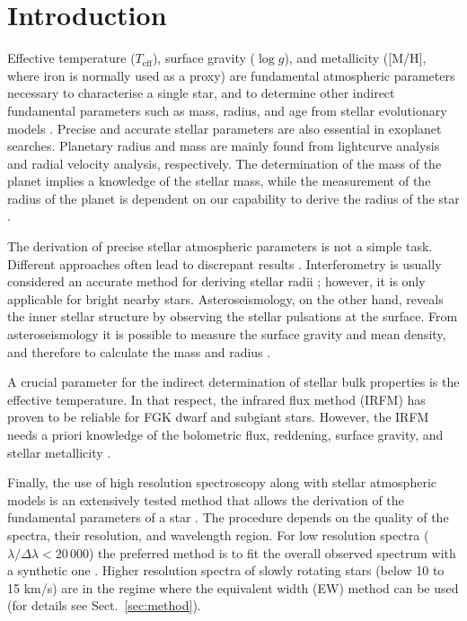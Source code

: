 \documentclass{aa}
\begin{document}
\maketitle



\section{Introduction}
\label{sec:introduction}

Effective temperature ($T_\mathrm{eff}$), surface gravity ($\log g$),
and metallicity ([M/H], where iron is normally used as a proxy)
are fundamental atmospheric parameters necessary to characterise a single
star, and to determine other indirect fundamental parameters
such as mass, radius, and age from stellar evolutionary models
\citep[see e.g.][]{Girardi2000,Dotter2008,Baraffe2015}.
Precise and accurate stellar parameters are also essential in
exoplanet searches. Planetary radius and mass are mainly found from
lightcurve analysis and radial velocity analysis, respectively. The
determination of the mass of the planet implies a knowledge of the
stellar mass, while the measurement of the radius of the planet
is dependent on our capability to derive the radius of the star
\citep[see e.g.][]{Torres2008,Ammler2009,Torres2012}.

The derivation of precise stellar atmospheric parameters is not a simple
task. Different approaches often lead to discrepant results \citep[see
e.g.][]{Santos13}. Interferometry is usually considered  an accurate
method for deriving stellar radii \citep[e.g.][]{Boyajian2012}; however,
it is only applicable for bright nearby stars. Asteroseismology, on the
other hand, reveals the inner stellar structure by observing the stellar
pulsations at the surface. From asteroseismology it is possible to
measure the surface gravity and mean density, and therefore to calculate
the mass and radius \citep[e.g.][]{Kjeldsen1995}.

A crucial parameter for the indirect determination of stellar bulk
properties is the effective temperature. In that respect, the infrared
flux method (IRFM) has proven to be reliable for FGK dwarf and
subgiant stars. However, the IRFM needs a priori knowledge of the
bolometric flux, reddening, surface gravity, and stellar metallicity
\citep{Blackwell1977,Ramirez2005b,Casagrande2010}.

Finally, the use of high resolution spectroscopy along with stellar
atmospheric models is an extensively tested method that allows
the derivation of the fundamental parameters of a star \citep[see
e.g.][]{Santos13,Valenti2005}. The procedure depends on the quality
of the spectra, their resolution, and wavelength region. For low
resolution spectra ($\lambda/\Delta\lambda < 20\,000$) the
preferred method is to fit the overall observed spectrum with a synthetic one
\citep[see e.g.][]{Recio2006}. Higher resolution spectra of
slowly rotating stars (below 10 to 15 \si{km/s})  are in the regime
where the equivalent width (EW) method can be used (for details see
Sect.~\ref{sec:method}).
\end{document}
